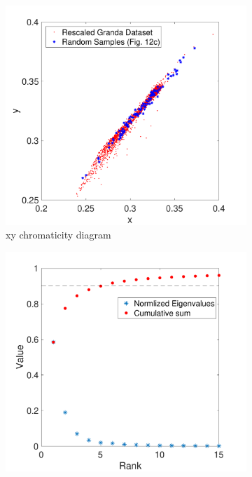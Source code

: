\documentclass{jov}
\begin{document}
\begin{figure}
	\begin{subfigure}[b]{0.3 \textwidth}
    \centering
        \includegraphics[width=\textwidth]{../Figures/Figure12/Figure12_d.pdf}
        \caption{xy chromaticity diagram}
        \label{fig:xyDiagram}
    \end{subfigure}
	\begin{subfigure}[b]{0.3 \textwidth}
    \centering
        \includegraphics[width=\textwidth]{../Figures/Figure12/Figure12_e.pdf}

\end{subfigure}
\end{figure}
\end{document}
